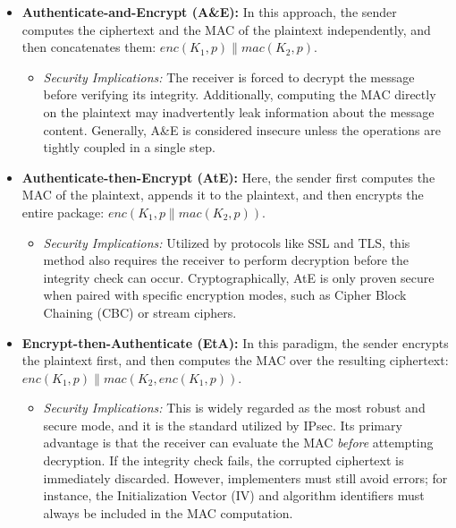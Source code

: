 \begin{itemize}
    \item \textbf{Authenticate-and-Encrypt (A\&E):} In this approach, the sender computes the ciphertext and the MAC of the plaintext independently, and then concatenates them: $enc(K_1, p) \parallel mac(K_2, p)$.
    \begin{itemize}
        \item \textit{Security Implications:} The receiver is forced to decrypt the message before verifying its integrity. Additionally, computing the MAC directly on the plaintext may inadvertently leak information about the message content. Generally, A\&E is considered insecure unless the operations are tightly coupled in a single step.
    \end{itemize}

    \item \textbf{Authenticate-then-Encrypt (AtE):} Here, the sender first computes the MAC of the plaintext, appends it to the plaintext, and then encrypts the entire package: $enc(K_1, p \parallel mac(K_2, p))$.
    \begin{itemize}
        \item \textit{Security Implications:} Utilized by protocols like SSL and TLS, this method also requires the receiver to perform decryption before the integrity check can occur. Cryptographically, AtE is only proven secure when paired with specific encryption modes, such as Cipher Block Chaining (CBC) or stream ciphers.
    \end{itemize}

    \item \textbf{Encrypt-then-Authenticate (EtA):} In this paradigm, the sender encrypts the plaintext first, and then computes the MAC over the resulting ciphertext: $enc(K_1, p) \parallel mac(K_2, enc(K_1, p))$.
    \begin{itemize}
        \item \textit{Security Implications:} This is widely regarded as the most robust and secure mode, and it is the standard utilized by IPsec. Its primary advantage is that the receiver can evaluate the MAC \textit{before} attempting decryption. If the integrity check fails, the corrupted ciphertext is immediately discarded. However, implementers must still avoid errors; for instance, the Initialization Vector (IV) and algorithm identifiers must always be included in the MAC computation.
    \end{itemize}
\end{itemize}


